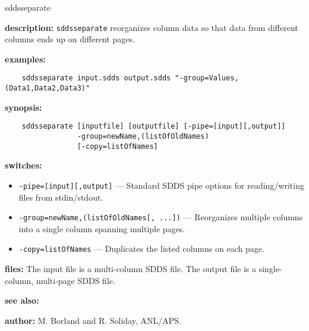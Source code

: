 \begin{sddsprog}{sddsseparate}
  \item \textbf{description:} \verb|sddsseparate| reorganizes column data so that data from different columns ends up on different pages.
  \item \textbf{examples:}
    \begin{verbatim}
    sddsseparate input.sdds output.sdds "-group=Values,(Data1,Data2,Data3)"
    \end{verbatim}
  \item \textbf{synopsis:}
    \begin{verbatim}
    sddsseparate [inputfile] [outputfile] [-pipe=[input][,output]]
                 -group=newName,(listOfOldNames)
                 [-copy=listOfNames]
    \end{verbatim}
  \item \textbf{switches:}
    \begin{itemize}
      \item \verb|-pipe=[input][,output]| --- Standard SDDS pipe options for reading/writing files from stdin/stdout.
      \item \verb|-group=newName,(listOfOldNames[, ...])| --- Reorganizes multiple columns into a single column spanning multiple pages.
      \item \verb|-copy=listOfNames| --- Duplicates the listed columns on each page.
    \end{itemize}
  \item \textbf{files:} The input file is a multi-column SDDS file. The output file is a single-column, multi-page SDDS file.
  \item \textbf{see also:} 
  \item \textbf{author:} M. Borland and R. Soliday, ANL/APS.
\end{sddsprog}

